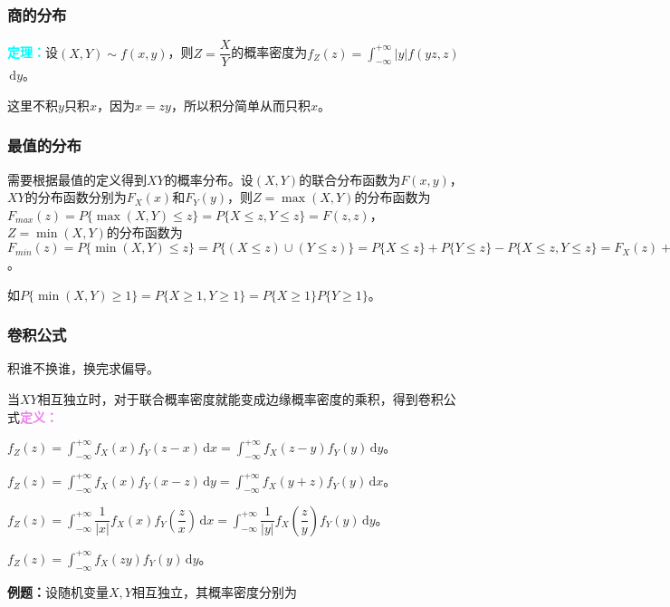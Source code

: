 \documentclass[UTF8, 12pt]{ctexart}
\begin{document}
\subsubsection{商的分布}

\textcolor{aqua}{\textbf{定理：}}设$(X,Y)\sim f(x,y)$，则$Z=\dfrac{X}{Y}$的概率密度为$f_Z(z)=\displaystyle{\int_{-\infty}^{+\infty}}\vert y\vert f(yz,z)$\\$\,\textrm{d}y$。

这里不积$y$只积$x$，因为$x=zy$，所以积分简单从而只积$x$。

\subsubsection{最值的分布}

需要根据最值的定义得到$XY$的概率分布。设$(X,Y)$的联合分布函数为$F(x,y)$，$XY$的分布函数分别为$F_X(x)$和$F_Y(y)$，则$Z=\max(X,Y)$的分布函数为$F_{max}(z)=P\{\max(X,Y)\leqslant z\}=P\{X\leqslant z,Y\leqslant z\}=F(z,z)$，$Z=\min(X,Y)$的分布函数为$F_{min}(z)=P\{\min(X,Y)\leqslant z\}=P\{(X\leqslant z)\cup(Y\leqslant z)\}=P\{X\leqslant z\}+P\{Y\leqslant z\}-P\{X\leqslant z,Y\leqslant z\}=F_X(z)+F_Y(z)-F(z,z)$。

如$P\{\min(X,Y)\geqslant 1\}=P\{X\geqslant1,Y\geqslant1\}=P\{X\geqslant1\}P\{Y\geqslant1\}$。

\subsubsection{卷积公式}

积谁不换谁，换完求偏导。

当$XY$相互独立时，对于联合概率密度就能变成边缘概率密度的乘积，得到卷积公式\textcolor{violet}{\textbf{定义：}}

$f_Z(z)=\int_{-\infty}^{+\infty}f_X(x)f_Y(z-x)\,\textrm{d}x=\int_{-\infty}^{+\infty}f_X(z-y)f_Y(y)\,\textrm{d}y$。

$f_Z(z)=\int_{-\infty}^{+\infty}f_X(x)f_Y(x-z)\,\textrm{d}y=\int_{-\infty}^{+\infty}f_X(y+z)f_Y(y)\,\textrm{d}x$。

$f_Z(z)=\displaystyle{\int_{-\infty}^{+\infty}}\dfrac{1}{\vert x\vert}f_X(x)f_Y\left(\dfrac{z}{x}\right)\,\textrm{d}x=\displaystyle{\int_{-\infty}^{+\infty}}\dfrac{1}{\vert y\vert}f_X\left(\dfrac{z}{y}\right)f_Y(y)\,\textrm{d}y$。

$f_Z(z)=\int_{-\infty}^{+\infty}f_X(zy)f_Y(y)\,\textrm{d}y$。

\textbf{例题：}设随机变量$X,Y$相互独立，其概率密度分别为
\end{document}
